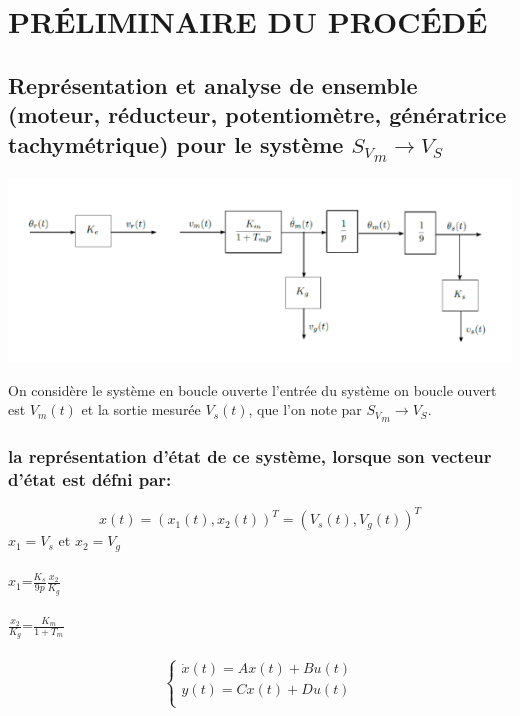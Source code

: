 \chapter{ PRÉLIMINAIRE DU PROCÉDÉ}
     \section{Représentation et analyse de ensemble (moteur, réducteur, potentiomètre, génératrice        tachymétrique) pour le système $ {S_V}_m \rightarrow V_S$ }
 

\begin{center}
\includegraphics[scale=0.5]{fiiig2.png}
\label{fig1} 
\end{center}

On considère le système en boucle ouverte l’entrée du système on boucle ouvert est $V_m(t)$ et la sortie mesurée $V_s(t)$, que l’on note  par $ {S_V}_m \rightarrow V_S$.


\subsection{la représentation d’état de ce système, lorsque son vecteur d’état est défni par:}


\begin{equation}
x(t)={(x_1(t),x_2(t))}^T={(V_s(t),V_g(t))}^T
\end{equation}
$x_1=V_s$ et $x_2=V_g$
\\\\


$x_1$=$\frac{K_s}{9p}\frac{x_2}{K_g}$\\\\
$\frac{x_2}{K_g}$=$\frac{K_m}{1+T_m}$
\\
\\

\begin{equation*}
\left\{\begin{matrix}
\dot{x}(t)=Ax(t)+Bu(t)\\ 
y(t)=Cx(t)+Du(t)\\
\end{matrix}\right.
\end{equation*}   

